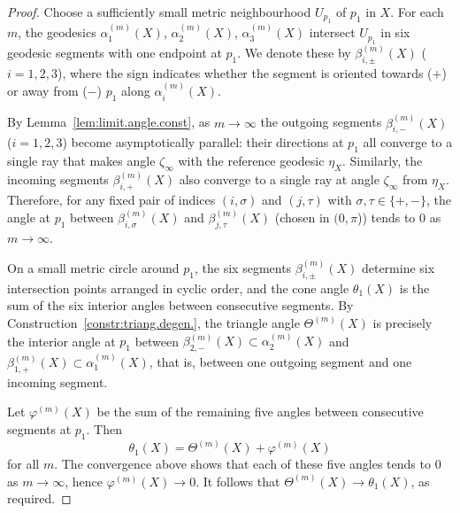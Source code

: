 \documentclass[11pt, letterpaper]{amsart}
\theoremstyle{definition}
\theoremstyle{remark}
\numberwithin{equation}{section}
\begin{document}
\begin{proof}
Choose a sufficiently small metric neighbourhood \(U_{p_1}\) of \(p_1\) in \(X\).
For each \(m\), the geodesics \(\alpha^{(m)}_1(X)\), \(\alpha^{(m)}_2(X)\),
\(\alpha^{(m)}_3(X)\) intersect \(U_{p_1}\) in six geodesic segments with one
endpoint at \(p_1\).  We denote these by
\(\beta^{(m)}_{i,\pm}(X)\) (\(i=1,2,3\)), where the sign indicates whether
the segment is oriented towards (\(+\)) or away from (\(-\)) \(p_1\) along
\(\alpha^{(m)}_i(X)\).

By Lemma~\ref{lem:limit.angle.const}, as \(m\to\infty\) the outgoing
segments \(\beta^{(m)}_{i,-}(X)\) (\(i=1,2,3\)) become asymptotically
parallel: their directions at \(p_1\) all converge to a single ray that
makes angle \(\zeta_\infty\) with the reference geodesic \(\eta_X\).
Similarly, the incoming segments \(\beta^{(m)}_{i,+}(X)\) also converge to a
single ray at angle \(\zeta_\infty\) from \(\eta_X\).
Therefore, for any fixed pair of indices \((i,\sigma)\) and \((j,\tau)\) with
\(\sigma,\tau\in\{+,-\}\), the angle at \(p_1\) between
\(\beta^{(m)}_{i,\sigma}(X)\) and \(\beta^{(m)}_{j,\tau}(X)\) (chosen in $(0,\pi$)) tends to \(0\)
as \(m\to\infty\). 

On a small metric circle around \(p_1\), the six segments
\(\beta^{(m)}_{i,\pm}(X)\) determine six intersection points arranged in
cyclic order, and the cone angle \(\theta_1(X)\) is the sum of the six
interior angles between consecutive segments.  By Construction~\ref{constr:triang.degen.}, the triangle angle
\(\Theta^{(m)}(X)\) is precisely the interior angle at \(p_1\) between
\(\beta_{2,-}^{(m)}(X)\subset\alpha^{(m)}_2(X)\) and \(\beta_{1,+}^{(m)}(X)\subset\alpha^{(m)}_1(X)\), that is, between one
outgoing segment and one incoming segment.

Let \(\varphi^{(m)}(X)\) be the sum of the remaining five angles between
consecutive segments at \(p_1\).  Then
\[
\theta_1(X)
= \Theta^{(m)}(X) + \varphi^{(m)}(X)
\]
for all \(m\).  The convergence above shows that each of these five angles
tends to \(0\) as \(m\to\infty\), hence \(\varphi^{(m)}(X)\to 0\).  It
follows that \(\Theta^{(m)}(X)\to \theta_1(X)\), as required.
\end{proof}
\end{document}
